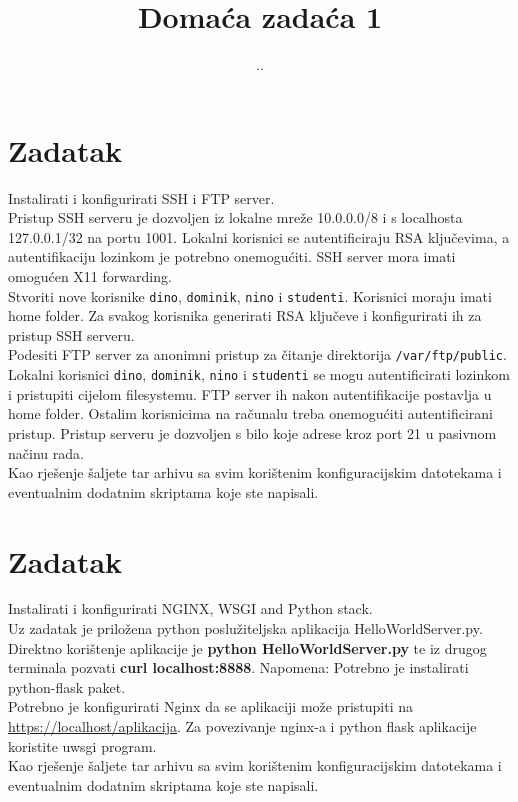 \documentclass[12pt,a4paper]{article}
\renewcommand{\dateseparator}{.}
\newcommand{\todayiso}{\twodigit\day \dateseparator \twodigit\month \dateseparator \the \year}
\begin{document}
	\title{Domaća zadaća 1}
    
    \date{\todayiso}
	\date{\vspace{-5ex} }
	\maketitle
	

\section{Zadatak}

Instalirati i konfigurirati SSH i FTP server.\\

Pristup SSH serveru je dozvoljen iz lokalne mreže 10.0.0.0/8 i s localhosta 127.0.0.1/32 na portu 1001. Lokalni korisnici se autentificiraju RSA ključevima, a autentifikaciju lozinkom je potrebno onemogućiti. SSH server mora imati omogućen X11 forwarding.\\
Stvoriti nove korisnike \texttt{dino}, \texttt{dominik}, \texttt{nino} i \texttt{studenti}. Korisnici moraju imati home folder. Za svakog korisnika generirati RSA ključeve i konfigurirati ih za pristup SSH serveru.\\

Podesiti FTP server za anonimni pristup za čitanje direktorija \texttt{/var/ftp/public}. Lokalni korisnici \texttt{dino}, \texttt{dominik}, \texttt{nino} i \texttt{studenti} se mogu autentificirati lozinkom i pristupiti cijelom filesystemu. FTP server ih nakon autentifikacije postavlja u home folder. Ostalim korisnicima na računalu treba onemogućiti autentificirani pristup. Pristup serveru je dozvoljen s bilo koje adrese kroz port 21 u pasivnom načinu rada.\\

Kao rješenje šaljete tar arhivu sa svim korištenim konfiguracijskim datotekama i eventualnim dodatnim skriptama koje ste napisali.


\section{Zadatak}

Instalirati i konfigurirati NGINX, WSGI and Python stack. \\

Uz zadatak je priložena python poslužiteljska aplikacija HelloWorldServer.py. \\
Direktno korištenje aplikacije je \textbf{python HelloWorldServer.py} te iz drugog terminala pozvati \textbf{curl localhost:8888}.
Napomena: Potrebno je instalirati python-flask paket. \\

Potrebno je konfigurirati Nginx da se aplikaciji može pristupiti na \url{https://localhost/aplikacija}. 
Za povezivanje nginx-a i python flask aplikacije koristite uwsgi program. \\

Kao rješenje šaljete tar arhivu sa svim korištenim konfiguracijskim datotekama i eventualnim dodatnim skriptama koje ste napisali.
\end{document}
